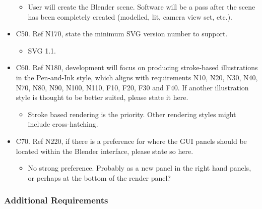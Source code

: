 \begin{itemize}
  \begin{itemize}
  \tightlist
  \item
    User will create the Blender scene. Software will be a pass after
    the scene has been completely created (modelled, lit, camera view
    set, etc.).
  \end{itemize}
\item
  C50. Ref N170, state the minimum SVG version number to support.

  \begin{itemize}
  \tightlist
  \item
    SVG 1.1.
  \end{itemize}
\item
  C60. Ref N180, development will focus on producing stroke-based
  illustrations in the Pen-and-Ink style, which aligns with requirements
  N10, N20, N30, N40, N70, N80, N90, N100, N110, F10, F20, F30 and F40.
  If another illustration style is thought to be better suited, please
  state it here.

  \begin{itemize}
  \tightlist
  \item
    Stroke based rendering is the priority. Other rendering styles might
    include cross-hatching.
  \end{itemize}
\item
  C70. Ref N220, if there is a preference for where the GUI panels
  should be located within the Blender interface, please state so here.

  \begin{itemize}
  \tightlist
  \item
    No strong preference. Probably as a new panel in the right hand
    panels, or perhaps at the bottom of the render panel?
  \end{itemize}
\end{itemize}

\subsubsection{Additional Requirements}\label{additional-requirements}

